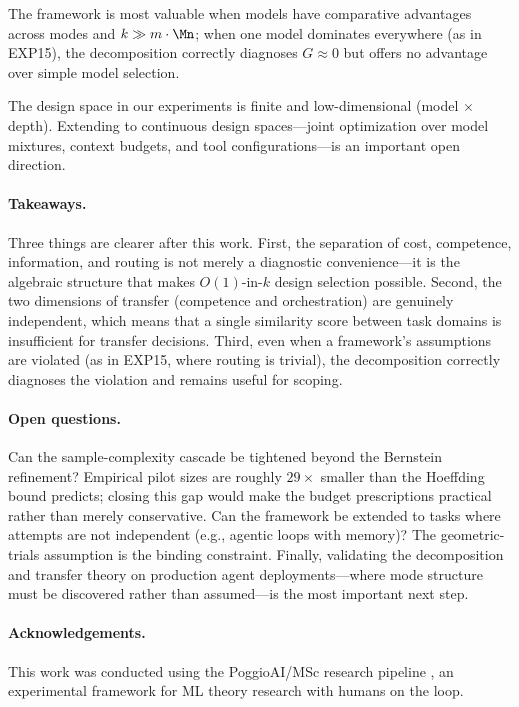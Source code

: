 The framework is most valuable when models have comparative advantages across modes and $k \gg m \cdot \Mn$; when one model dominates everywhere (as in EXP15), the decomposition correctly diagnoses $G \approx 0$ but offers no advantage over simple model selection.

The design space in our experiments is finite and low-dimensional
(model $\times$ depth).  Extending to continuous design spaces---joint
optimization over model mixtures, context budgets, and tool
configurations---is an important open direction.

\paragraph{Takeaways.}
Three things are clearer after this work.
First, the separation of cost, competence, information, and routing
is not merely a diagnostic convenience---it is the algebraic structure
that makes $O(1)$-in-$k$ design selection possible.
Second, the two dimensions of transfer (competence and orchestration)
are genuinely independent, which means that a single similarity score
between task domains is insufficient for transfer decisions.
Third, even when a framework's assumptions are violated (as in EXP15,
where routing is trivial), the decomposition correctly diagnoses the
violation and remains useful for scoping.

\paragraph{Open questions.}
Can the sample-complexity cascade be tightened beyond the Bernstein
refinement?  Empirical pilot sizes are roughly $29\times$ smaller than
the Hoeffding bound predicts; closing this gap would make the budget
prescriptions practical rather than merely conservative.
Can the framework be extended to tasks where attempts are not independent
(e.g., agentic loops with memory)?  The geometric-trials assumption is
the binding constraint.
Finally, validating the decomposition and transfer theory on production
agent deployments---where mode structure must be discovered rather than
assumed---is the most important next step.

\paragraph{Acknowledgements.}
This work was conducted using the PoggioAI/MSc research pipeline
\citep{PoggioAIMSc_2026}, an experimental framework for ML theory
research with humans on the loop.
